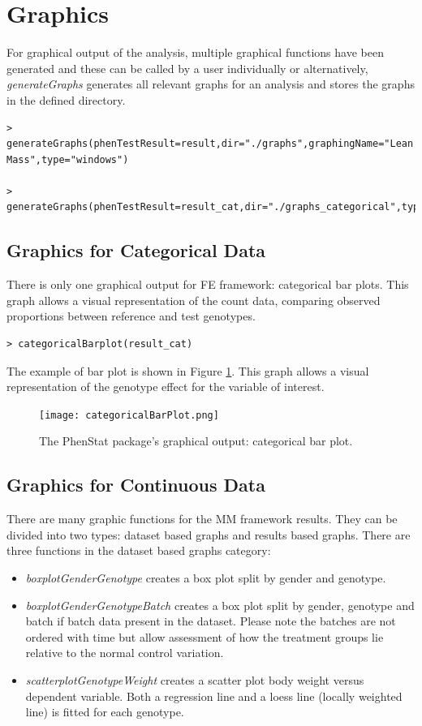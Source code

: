 \documentclass[12pt,a4paper]{article}
\begin{document}
\section{Graphics}
For graphical output of the analysis, multiple graphical functions have been generated and these can be called by a user individually or alternatively, 
\textit{generateGraphs} generates all relevant graphs for an analysis and stores the graphs in the defined directory. 

\begingroup
    \fontsize{8pt}{12pt}\selectfont
\begin{verbatim}
> generateGraphs(phenTestResult=result,dir="./graphs",graphingName="Lean Mass",type="windows")

> generateGraphs(phenTestResult=result_cat,dir="./graphs_categorical",type="windows")
\end{verbatim}
\endgroup 

\subsection{Graphics for Categorical Data}
There is only one graphical output for FE framework: categorical bar plots. This graph allows a visual representation of the count data, comparing observed proportions between reference and test genotypes.  

\begingroup
    \fontsize{8pt}{12pt}\selectfont
\begin{verbatim}
> categoricalBarplot(result_cat)
\end{verbatim}
\endgroup 

The example of bar plot is shown in Figure \ref{fig:06}. This graph allows a visual representation of the genotype effect for the variable of interest.
\begin{figure}[!htpb]%
\centerline{\texttt{[image: categoricalBarPlot.png]}}
\caption{The PhenStat package's graphical output: categorical bar plot.}\label{fig:06}
\end{figure}

\subsection{Graphics for Continuous Data}
There are many graphic functions for the MM framework results. They can be divided into two types: dataset based graphs and results based graphs.
There are three functions in the dataset based graphs category:
\begin{itemize}
\item \textit{boxplotGenderGenotype} creates a box plot split by gender and genotype.
\item \textit{boxplotGenderGenotypeBatch} creates a box plot split by gender, genotype and batch if batch data present in the dataset. Please note the batches are not ordered with time but allow assessment of how the treatment groups lie relative to the normal control variation.
\item \textit{scatterplotGenotypeWeight} creates a scatter plot body weight versus dependent variable. Both a regression line and a loess line (locally weighted line) is fitted for each genotype.
\end{itemize}
\end{document}
